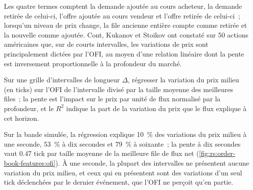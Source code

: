 Les quatre termes comptent la demande ajoutée au cours acheteur, la demande retirée de celui-ci, l'offre ajoutée au cours vendeur et l'offre retirée de celui-ci~; lorsqu'un
niveau de prix change, la file ancienne entière compte comme retirée et la nouvelle comme ajoutée. Cont, Kukanov et Stoikov ont constaté sur 50 actions américaines
que, sur de courts intervalles, les variations de prix sont principalement dictées par l'OFI, au moyen d'une relation linéaire dont la pente est inversement proportionnelle
à la profondeur du marché.

\begin{method}\label{met:rs:order-book-features:ofi}
Sur une grille d'intervalles de longueur $\Delta$, régresser la variation du prix milieu (en ticks) sur l'OFI de l'intervalle divisé par la taille moyenne des meilleures files~;
la pente est l'impact sur le prix par unité de flux normalisé par la profondeur, et le $R^2$ indique la part de la variation du prix que le
flux explique à cet horizon.
\end{method}

Sur la bande simulée, la régression explique 10~\% des variations du prix milieu à une seconde, 53~\% à dix secondes et 79~\% à soixante~; la pente à dix
secondes vaut 0.47 tick par taille moyenne de la meilleure file de flux net (\cref{fig:rs:order-book-features:ofi}). À une seconde, la plupart des intervalles
ne présentent aucune variation du prix milieu, et ceux qui en présentent sont des variations d'un seul tick déclenchées par le dernier événement, que l'OFI ne perçoit qu'en partie.

\begin{omfigure}

\label{fig:rs:order-book-features:ofi}
\end{omfigure}

